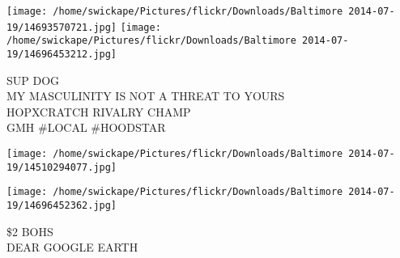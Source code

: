 \documentclass[10pt,letterpaper]{article}
\begin{document}
\texttt{[image: /home/swickape/Pictures/flickr/Downloads/Baltimore 2014-07-19/14693570721.jpg]}
\texttt{[image: /home/swickape/Pictures/flickr/Downloads/Baltimore 2014-07-19/14696453212.jpg]}

SUP DOG\\
MY MASCULINITY IS NOT A THREAT TO YOURS\\
HOPXCRATCH RIVALRY CHAMP\\
GMH \#LOCAL \#HOODSTAR\\
\pagebreak

\texttt{[image: /home/swickape/Pictures/flickr/Downloads/Baltimore 2014-07-19/14510294077.jpg]}

\vspace{0.25in}
\texttt{[image: /home/swickape/Pictures/flickr/Downloads/Baltimore 2014-07-19/14696452362.jpg]}

\$2 BOHS\\
DEAR GOOGLE EARTH\\
\pagebreak
\end{document}
